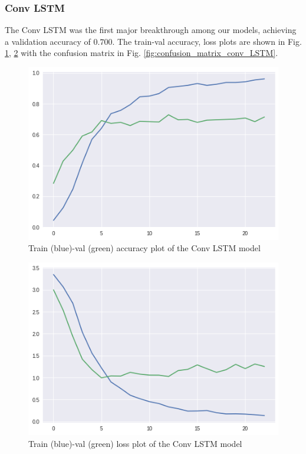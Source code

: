 \documentclass[conference]{IEEEtran}
\begin{document}
\subsubsection{Conv LSTM}
The Conv LSTM was the first major breakthrough among our models, achieving a validation accuracy of $0.700$. The train-val accuracy, loss plots are shown in Fig. \ref{fig:train_val_acc_conv_LSTM}, \ref{fig:train_val_loss_conv_LSTM} with the confusion matrix in Fig.
\ref{fig:confusion_matrix_conv_LSTM}.
\begin{figure}[H]
\begin{center}
\includegraphics[scale=0.4]{conv_LSTM/conv_LSTM_acc_plot.png}
\end{center}
\caption{\label{fig:train_val_acc_conv_LSTM} 
Train (blue)-val (green) accuracy plot of the Conv LSTM model}
\end{figure}
\begin{figure}[H]
\begin{center}
\includegraphics[scale=0.4]{conv_LSTM/conv_LSTM_loss_plot.png}
\end{center}
\caption{\label{fig:train_val_loss_conv_LSTM} 
Train (blue)-val (green) loss plot of the Conv LSTM model}
\end{figure}
\end{document}
